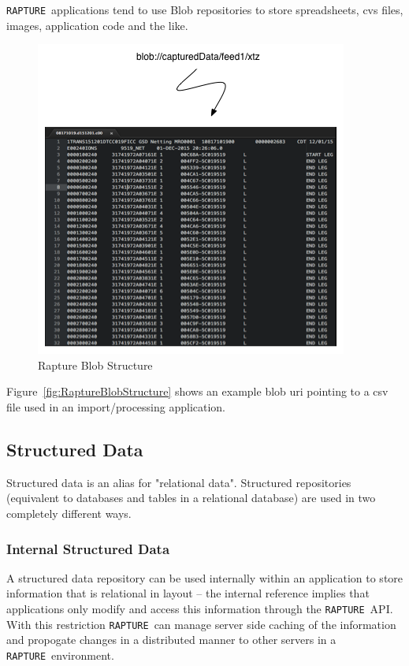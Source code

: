 \documentclass[12pt,twoside,a4paper]{book}
\newcommand{\Rapture}{\Verb+RAPTURE+~}
\begin{document}
\Rapture applications tend to use Blob repositories to store spreadsheets, cvs files, images, application code and the like.

\begin{figure}[htb]
\centering
\includegraphics[scale=0.75]{Graphics/RaptureBlobExplain}
\caption{Rapture Blob Structure}
\label{fig:RaptureBlobStructure}
\end{figure}

Figure~\vref{fig:RaptureBlobStructure} shows an example blob uri pointing to a csv file
used in an import/processing application.

\subsection{Structured Data}

Structured data is an alias for "relational data". Structured repositories (equivalent to databases and tables in
a relational database) are used in two completely different ways.

\subsubsection{Internal Structured Data}

A structured data repository can be used internally within an application to store information that is relational in
layout -- the internal reference implies that applications only modify and access this information through the \Rapture API. With
this restriction \Rapture can manage server side caching of the information and propogate changes in a distributed manner to
other servers in a \Rapture environment.
\end{document}
